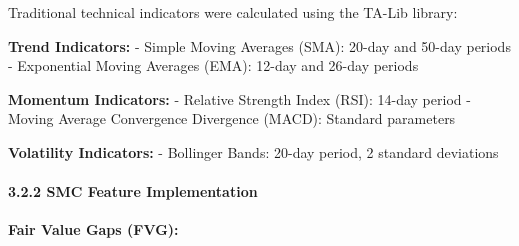 Traditional technical indicators were calculated using the TA-Lib
library:

\textbf{Trend Indicators:} - Simple Moving Averages (SMA): 20-day and
50-day periods - Exponential Moving Averages (EMA): 12-day and 26-day
periods

\textbf{Momentum Indicators:} - Relative Strength Index (RSI): 14-day
period - Moving Average Convergence Divergence (MACD): Standard
parameters

\textbf{Volatility Indicators:} - Bollinger Bands: 20-day period, 2
standard deviations

\paragraph{3.2.2 SMC Feature
Implementation}\label{smc-feature-implementation}

\textbf{Fair Value Gaps (FVG):}

